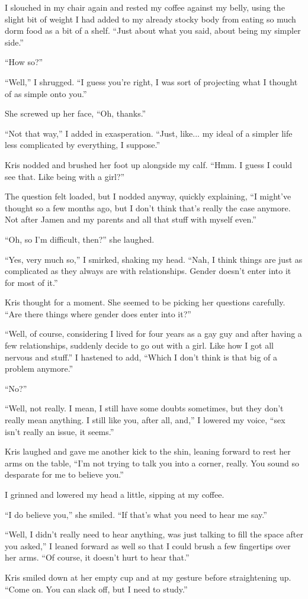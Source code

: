 I slouched in my chair again and rested my coffee against my belly, using the slight bit of weight I had added to my already stocky body from eating so much dorm food as a bit of a shelf.  ``Just about what you said, about being my simpler side.''

``How so?''

``Well,'' I shrugged.  ``I guess you're right, I was sort of projecting what I thought of as simple onto you.''

She screwed up her face, ``Oh, thanks.''

``Not that way,'' I added in exasperation.  ``Just, like... my ideal of a simpler life less complicated by everything, I suppose.''

Kris nodded and brushed her foot up alongside my calf.  ``Hmm.  I guess I could see that.  Like being with a girl?''

The question felt loaded, but I nodded anyway, quickly explaining, ``I might've thought so a few months ago, but I don't think that's really the case anymore.  Not after Jamen and my parents and all that stuff with myself even.''

``Oh, so I'm difficult, then?'' she laughed.

``Yes, very much so,'' I smirked, shaking my head.  ``Nah, I think things are just as complicated as they always are with relationships.  Gender doesn't enter into it for most of it.''

Kris thought for a moment.  She seemed to be picking her questions carefully.  ``Are there things where gender does enter into it?''

``Well, of course, considering I lived for four years as a gay guy and after having a few relationships, suddenly decide to go out with a girl.  Like how I got all nervous and stuff.''  I hastened to add, ``Which I don't think is that big of a problem anymore.''

``No?''

``Well, not really.  I mean, I still have some doubts sometimes, but they don't really mean anything.  I still like you, after all, and,'' I lowered my voice, ``sex isn't really an issue, it seems.''

Kris laughed and gave me another kick to the shin, leaning forward to rest her arms on the table, ``I'm not trying to talk you into a corner, really.  You sound so desparate for me to believe you.''

I grinned and lowered my head a little, sipping at my coffee.

``I do believe you,'' she smiled.  ``If that's what you need to hear me say.''

``Well, I didn't really need to hear anything, was just talking to fill the space after you asked,'' I leaned forward as well so that I could brush a few fingertips over her arms.  ``Of course, it doesn't hurt to hear that.''

Kris smiled down at her empty cup and at my gesture before straightening up.  ``Come on.  You can slack off, but I need to study.''
